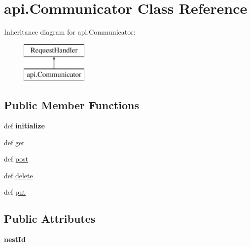 \hypertarget{classapi_1_1_communicator}{\section{api.\-Communicator Class Reference}
\label{classapi_1_1_communicator}
}
Inheritance diagram for api.\-Communicator\-:\begin{figure}[H]
\begin{center}
\leavevmode
\includegraphics[height=2.000000cm]{classapi_1_1_communicator}
\end{center}
\end{figure}
\subsection*{Public Member Functions}
\begin{DoxyCompactItemize}
\item 
\hypertarget{classapi_1_1_communicator_a52ef801f9faaf4195e3824aba8ac1d65}{def {\bfseries initialize}}\label{classapi_1_1_communicator_a52ef801f9faaf4195e3824aba8ac1d65}

\item 
def \hyperlink{classapi_1_1_communicator_abc45b289619e0988116e80b35b7fabb9}{get}
\item 
def \hyperlink{classapi_1_1_communicator_acf9eee605fa05aafd4ef7b9caa7e3064}{post}
\item 
def \hyperlink{classapi_1_1_communicator_a7b1910fd8ee6416508032e9c533634da}{delete}
\item 
def \hyperlink{classapi_1_1_communicator_af5958bce2d64cec51a03c6c27b44122c}{put}
\end{DoxyCompactItemize}
\subsection*{Public Attributes}
\begin{DoxyCompactItemize}
\item 
\hypertarget{classapi_1_1_communicator_ad81c8f11473c4779f45fb7ca8993b5bd}{{\bfseries nest\-Id}}\label{classapi_1_1_communicator_ad81c8f11473c4779f45fb7ca8993b5bd}

\end{DoxyCompactItemize}


